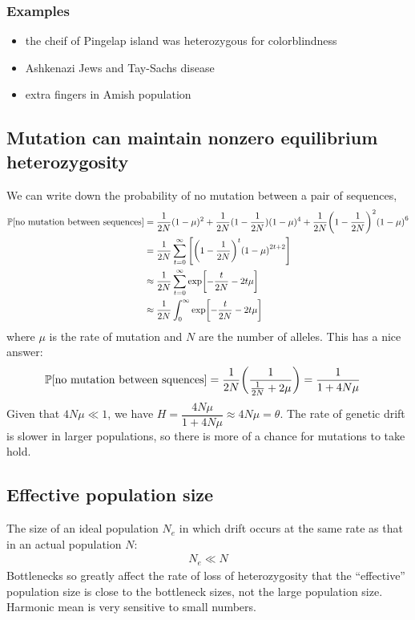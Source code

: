 \documentclass{article}
\newcommand{\prob}[1]{\mathbb{P}\qty[#1]}
\begin{document}
            \subsubsection{Examples}
                \begin{itemize}
                    \item the cheif of Pingelap island was heterozygous for colorblindness
                    \item Ashkenazi Jews and Tay-Sachs disease
                    \item extra fingers in Amish population
                \end{itemize}
        \subsection{Mutation can maintain nonzero equilibrium heterozygosity}
            We can write down the probability of no mutation between a pair of sequences,
            \begin{align*}
                \prob{\text{no mutation between sequences}} &= \frac{1}{2N}(1 - \mu)^2 + \frac{1}{2N}(1 - \frac{1}{2N})(1 - \mu)^4 + \frac{1}{2N}\qty(1 - \frac{1}{2N})^2\qty(1 - \mu)^6 \\
                &= \frac{1}{2N}\sum_{t=0}^\infty\qty[\qty(1-\frac{1}{2N})^t\qty(1 - \mu)^{2t+2}] \\
                &\approx \frac{1}{2N}\sum_{t=0}^\infty \exp[-\frac{t}{2N} - 2t\mu] \\
                &\approx \frac{1}{2N} \int_0^\infty \exp[-\frac{t}{2N} - 2t\mu]
            \end{align*}
            where $\mu$ is the rate of mutation and $N$ are the number of alleles.  This has a nice answer:
            \begin{align*}
                \prob{\text{no mutation between squences}} &= \frac{1}{2N}\qty(\frac{1}{\frac{1}{2N} + 2\mu}) = \frac{1}{1 + 4N\mu}
            \end{align*}
            Given that $4N\mu \ll 1$, we have $H = \dfrac{4N\mu}{1 + 4N\mu} \approx 4N\mu = \theta$.  The rate of genetic drift is slower in larger populations, so there is more of a chance for mutations to take hold.
        \subsection{Effective population size}
            The size of an ideal population $N_e$ in which drift occurs at the same rate as that in an actual population $N$:
            \begin{align*}
                N_e \ll N
            \end{align*}
            Bottlenecks so greatly affect the rate of loss of heterozygosity that the ``effective'' population size is close to the bottleneck sizes, not the large population size.  Harmonic mean is very sensitive to small numbers.
\end{document}
